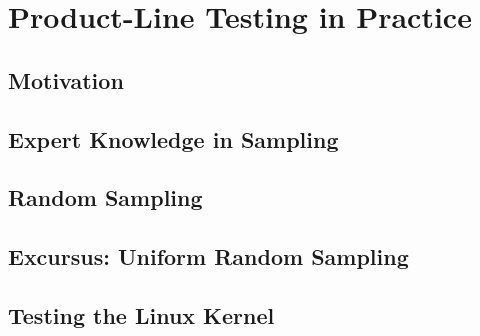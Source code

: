 

\subtitle{11. Product-Line Testing}
\author{Thomas Thüm}





\section{Product-Line Testing in Practice}

\subsection{Motivation}

\subsection{Expert Knowledge in Sampling}

\subsection{Random Sampling}

\subsection{Excursus: Uniform Random Sampling}

\subsection{Testing the Linux Kernel}



